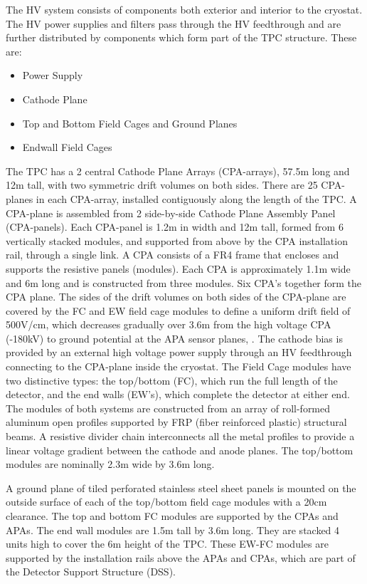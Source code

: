 The HV system consists of components both exterior and interior to the cryostat. The HV power supplies and filters pass through the HV feedthrough and are further distributed by components which form part of the TPC structure. These are:
\begin{itemize}
\item Power Supply
\item Cathode Plane
\item Top and Bottom Field Cages and Ground Planes
\item Endwall Field Cages 
\end{itemize}
The TPC has a 2 central Cathode Plane Arrays (CPA-arrays), 57.5m long and 12m tall, with two symmetric drift volumes on both sides. There are 25 CPA-planes in each CPA-array, installed contiguously along the length of the TPC. A CPA-plane is assembled from 2 side-by-side Cathode Plane Assembly Panel (CPA-panels). Each CPA-panel is 1.2m in width and 12m tall, formed from 6 vertically stacked modules, and supported from above by the CPA installation rail, through a single link.
A CPA consists of a FR4 frame that encloses and supports the resistive panels (modules).  Each CPA is approximately 1.1m wide and 6m long and is constructed from three modules.  Six CPA's together form the CPA plane. 
The sides of the drift volumes on both sides of the CPA-plane are covered by the FC and EW field cage modules to define a uniform drift field of 500V/cm, which decreases gradually over 3.6m from the high voltage CPA (-180kV) to ground potential at the APA sensor planes, . The cathode bias is provided by an external high voltage power supply through an HV feedthrough connecting to the CPA-plane inside the cryostat.
The Field Cage modules have two distinctive types: the top/bottom (FC), which run the full length of the detector, and the end walls (EW's), which complete the detector at either end. The modules of both systems are constructed from an array of roll-formed aluminum open profiles supported by FRP (fiber reinforced plastic) structural beams. A resistive divider chain interconnects all the metal profiles to provide a linear voltage gradient between the cathode and anode planes.  The top/bottom modules are nominally 2.3m wide by 3.6m long. 

A ground plane of tiled perforated stainless steel sheet panels is mounted on the outside surface of each of the top/bottom field cage modules with a 20cm clearance. The top and bottom  FC modules are supported by the CPAs and APAs. The end wall modules are 1.5m tall by 3.6m long. They are stacked 4 units high to cover the 6m height of the TPC.  These EW-FC modules are supported by the installation rails above  the APAs and CPAs, which are part of the Detector Support Structure (DSS). 




